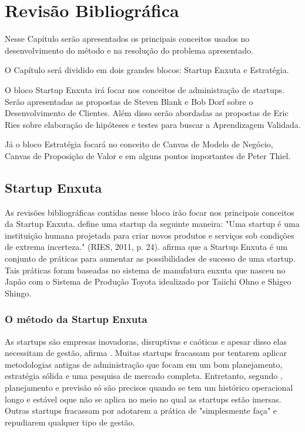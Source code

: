 \chapter[Revisão Bibliográfica]{Revisão Bibliográfica}
\label{chap:revisao}

Nesse Capítulo serão apresentados os principais conceitos usados no desenvolvimento do método e na resolução do problema apresentado.

O Capítulo será dividido em dois grandes blocos: Startup Enxuta e Estratégia.

O bloco Startup Enxuta irá focar nos conceitos de administração de startups. Serão apresentadas as propostas de Steven Blank e Bob Dorf sobre o Desenvolvimento de Clientes. Além disso serão abordadas as propostas de Eric Ries sobre elaboração de hipóteses e testes para buscar a Aprendizagem Validada.

Já o bloco Estratégia focará no conceito de Canvas de Modelo de Negócio, Canvas de Proposição de Valor e em alguns pontos importantes de Peter Thiel.

\section{Startup Enxuta}
\label{cha:startupenxuta}
As revisões bibliográficas contidas nesse bloco irão focar nos principais conceitos da Startup Enxuta.  define uma startup da seguinte maneira: "Uma startup é uma instituição humana projetada para criar novos produtos e serviços sob condições de extrema incerteza." (RIES, 2011, p. 24).  afirma que a Startup Enxuta é um conjunto de práticas para aumentar as possibilidades de sucesso de uma startup. Tais práticas foram baseadas no sistema de manufatura enxuta que nasceu no Japão com o Sistema de Produção Toyota idealizado por Taiichi Ohno e Shigeo Shingo.

\subsection{O método da Startup Enxuta}
\label{cha:metodostartupenxuta}
As startups são empresas inovadoras, disruptivas e caóticas e apesar disso elas necessitam de gestão, afirma . Muitas startups fracassam por tentarem aplicar metodologias antigas de administração que focam em um bom planejamento, estratégia sólida e uma pesquisa de mercado completa. Entretanto, segundo , planejamento e previsão só são precisos quando se tem um histórico operacional longo e estável oque não se aplica no meio no qual as startups estão imersas. Outras startups fracassam por adotarem a prática de "simplesmente faça" e repudiarem qualquer tipo de gestão.

